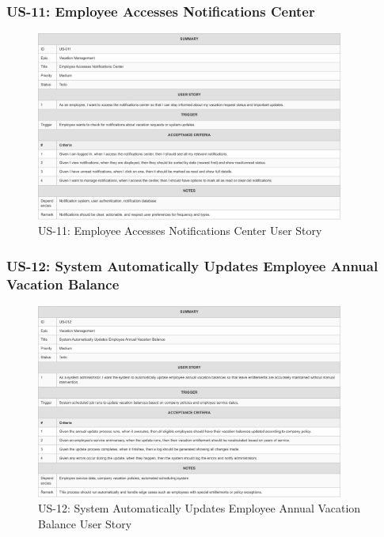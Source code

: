 \documentclass[12pt,a4paper]{article}
\begin{document}
\subsubsection{US-11: Employee Accesses Notifications Center}
\begin{figure}[H]
\centering
\includegraphics[width=0.9\textwidth]{User-Stories/US-11-Employee-Accesses-Notifications-Center/US-11-Employee-Accesses-Notifications-Center-1.png}
\caption{US-11: Employee Accesses Notifications Center User Story}
\label{fig:us11}
\end{figure}

\subsubsection{US-12: System Automatically Updates Employee Annual Vacation Balance}
\begin{figure}[H]
\centering
\includegraphics[width=0.9\textwidth]{User-Stories/US-12-System-Automatically-Updates-Employee-Annual-Vacation-Balance/US-12-System-Automatically-Updates-Employee-Annual-Vacation-Balance-1.png}
\caption{US-12: System Automatically Updates Employee Annual Vacation Balance User Story}
\label{fig:us12}
\end{figure}
\end{document}
